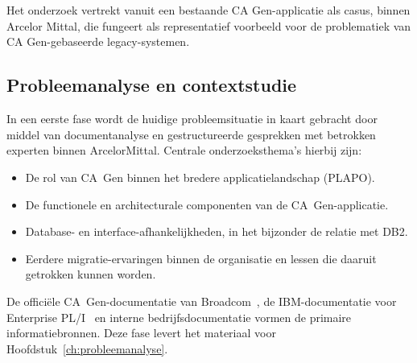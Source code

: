 
\chapter{}%
\label{ch:methodologie}


Het onderzoek vertrekt vanuit een bestaande CA Gen-applicatie als casus, binnen Arcelor Mittal, die fungeert als representatief voorbeeld voor de problematiek van 
CA Gen-gebaseerde legacy-systemen.

\section{Probleemanalyse en contextstudie}
\label{sec:meth-probleemanalyse}

In een eerste fase wordt de huidige probleemsituatie in kaart gebracht door middel van documentanalyse en
gestructureerde gesprekken met betrokken experten binnen ArcelorMittal. Centrale
onderzoeksthema's hierbij zijn:
\begin{itemize}
    \item De rol van CA~Gen binnen het bredere applicatielandschap (PLAPO).
    \item De functionele en architecturale componenten van de CA~Gen-applicatie.
    \item Database- en interface-afhankelijkheden, in het bijzonder de relatie met DB2.
    \item Eerdere migratie-ervaringen binnen de organisatie en lessen die daaruit getrokken kunnen worden.
\end{itemize}
De officiële CA~Gen-documentatie van Broadcom~\autocite{Broadcom2013}, de IBM-documentatie voor Enterprise
PL/I~\autocite{IBM2025} en interne bedrijfsdocumentatie vormen de primaire informatiebronnen. Deze fase
levert het materiaal voor Hoofdstuk~\ref{ch:probleemanalyse}.


